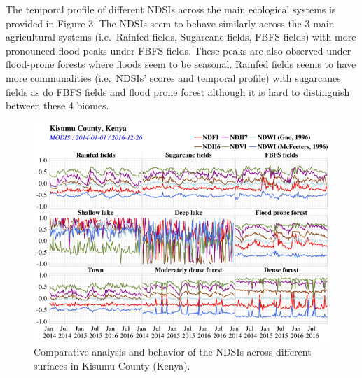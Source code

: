 \documentclass[12pt,oneside]{article}
\begin{document}
The temporal profile of different NDSIs across the main ecological
systems is provided in Figure 3. The NDSIs seem to behave similarly
across the 3 main agricultural systems (i.e.~Rainfed fields, Sugarcane
fields, FBFS fields) with more pronounced flood peaks under FBFS fields.
These peaks are also observed under flood-prone forests where floods
seem to be seasonal. Rainfed fields seems to have more communalities
(i.e.~NDSIs' scores and temporal profile) with sugarcanes fields as do
FBFS fields and flood prone forest although it is hard to distinguish
between these 4 biomes.

\begin{figure}
\includegraphics[width=1\linewidth]{figures/Mapping_FBFS_ndsi_comparaison} \caption{Comparative analysis and behavior of the NDSIs across different surfaces in Kisumu County (Kenya).}\label{fig:fig3}
\end{figure}
\end{document}
